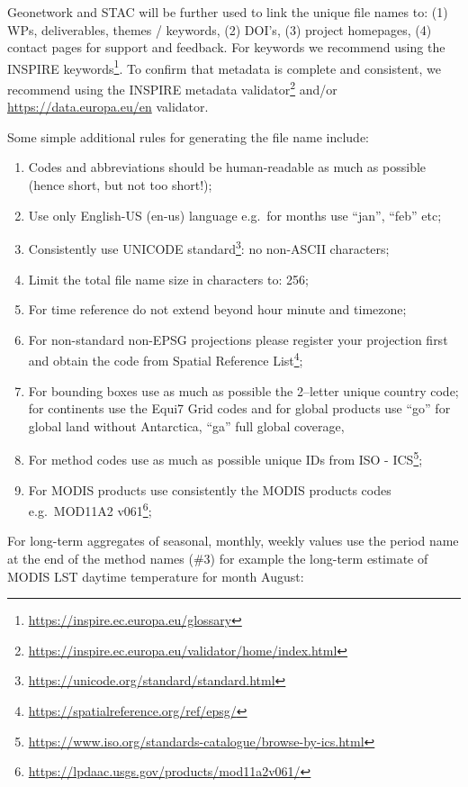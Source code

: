 \documentclass[
  graybox,natbib,nospthms]{svmono}
\providecommand{\tightlist}{%
  \setlength{\itemsep}{0pt}\setlength{\parskip}{0pt}}
\providecommand{\tightlist}{\setlength{\itemsep}{0pt}\setlength{\parskip}{0pt}}
\renewcommand{\href}[2]{#2 (\url{#1})}
\renewcommand{\href}[2]{#2\footnote{\url{#1}}}
\begin{document}
Geonetwork and STAC will be further used to link the unique file names to: (1) WPs, deliverables, themes / keywords, (2) DOI's, (3) project homepages, (4) contact pages for support and feedback. For keywords we recommend using the \href{https://inspire.ec.europa.eu/glossary}{INSPIRE keywords}. To confirm that metadata is complete and consistent, we recommend using the \href{https://inspire.ec.europa.eu/validator/home/index.html}{INSPIRE metadata validator} and/or \url{https://data.europa.eu/en} validator.

Some simple additional rules for generating the file name include:

\begin{enumerate}
\def\labelenumi{\arabic{enumi}.}
\tightlist
\item
  Codes and abbreviations should be human-readable as much as possible (hence short, but not too short!);
\item
  Use only English-US (en-us) language e.g.~for months use ``jan'', ``feb'' etc;
\item
  Consistently use \href{https://unicode.org/standard/standard.html}{UNICODE standard}: no non-ASCII characters;
\item
  Limit the total file name size in characters to: 256;
\item
  For time reference do not extend beyond hour minute and timezone;
\item
  For non-standard non-EPSG projections please register your projection first and obtain the code from \href{https://spatialreference.org/ref/epsg/}{Spatial Reference List};
\item
  For bounding boxes use as much as possible the 2--letter unique country code; for continents use the Equi7 Grid codes and for global products use ``go'' for global land without Antarctica, ``ga'' full global coverage,
\item
  For method codes use as much as possible unique IDs from \href{https://www.iso.org/standards-catalogue/browse-by-ics.html}{ISO - ICS};
\item
  For MODIS products use consistently the MODIS products codes e.g.~\href{https://lpdaac.usgs.gov/products/mod11a2v061/}{MOD11A2 v061};
\end{enumerate}

For long-term aggregates of seasonal, monthly, weekly values use the period name at the end of the method names (\#3) for example the long-term estimate of MODIS LST daytime temperature for month August:
\end{document}
